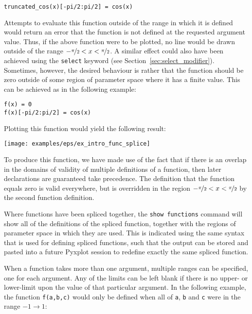 \begin{verbatim}
truncated_cos(x)[-pi/2:pi/2] = cos(x)
\end{verbatim}

\noindent Attempts to evaluate this function outside of the range in which it
is defined would return an error that the function is not defined at the
requested argument value. Thus, if the above function were to be plotted, no
line would be drawn outside of the range
$-\nicefrac{\pi}{2}<x<\nicefrac{\pi}{2}$. A similar effect could also have been
achieved using the {\tt select} keyword (see
Section~\ref{sec:select_modifier}). Sometimes, however, the desired behaviour
is rather that the function should be zero outside of some region of parameter
space where it has a finite value. This can be achieved as in the following
example:

\begin{verbatim}
f(x) = 0
f(x)[-pi/2:pi/2] = cos(x)
\end{verbatim}

\noindent Plotting this function would yield the following result:

\begin{center}
\texttt{[image: examples/eps/ex\_intro\_func\_splice]}
\end{center}

\noindent To produce this function, we have made use of the fact that if there
is an overlap in the domains of validity of multiple definitions of a function,
then later declarations are guaranteed take precedence. The definition that the
function equals zero is valid everywhere, but is overridden in the region
$-\nicefrac{\pi}{2}<x<\nicefrac{\pi}{2}$ by the second function definition.

Where functions have been spliced together, the {\tt show functions} command
will show all of the definitions of the spliced function, together with the
regions of parameter space in which they are used. This is indicated using the
same syntax that is used for defining spliced functions, such that the output can
be stored and pasted into a future Pyxplot session to redefine exactly the same
spliced function.

When a function takes more than one argument, multiple ranges can be specified,
one for each argument. Any of the limits can be left blank if there is no
upper- or lower-limit upon the value of that particular argument. In the
following example, the function {\tt f(a,b,c)} would only be defined when all
of {\tt a}, {\tt b} and {\tt c} were in the range $-1 \to 1$:


